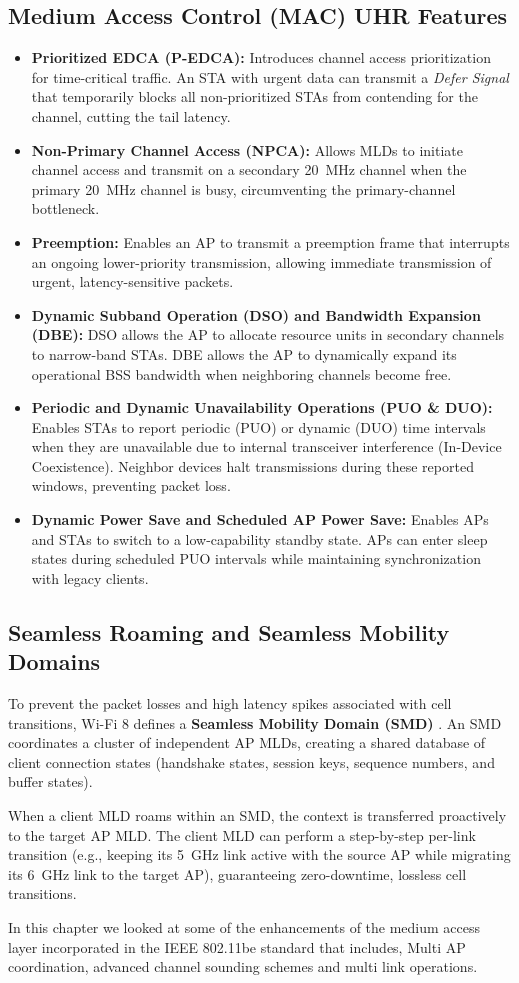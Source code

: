 \subsection{Medium Access Control (MAC) UHR Features}
\begin{itemize}
    \item \textbf{Prioritized EDCA (P-EDCA):} Introduces channel access prioritization for time-critical traffic. An STA with urgent data can transmit a \textit{Defer Signal} that temporarily blocks all non-prioritized STAs from contending for the channel, cutting the tail latency.
    \item \textbf{Non-Primary Channel Access (NPCA):} Allows MLDs to initiate channel access and transmit on a secondary 20~MHz channel when the primary 20~MHz channel is busy, circumventing the primary-channel bottleneck.
    \item \textbf{Preemption:} Enables an AP to transmit a preemption frame that interrupts an ongoing lower-priority transmission, allowing immediate transmission of urgent, latency-sensitive packets.
    \item \textbf{Dynamic Subband Operation (DSO) and Bandwidth Expansion (DBE):} DSO allows the AP to allocate resource units in secondary channels to narrow-band STAs. DBE allows the AP to dynamically expand its operational BSS bandwidth when neighboring channels become free.
    \item \textbf{Periodic and Dynamic Unavailability Operations (PUO \& DUO):} Enables STAs to report periodic (PUO) or dynamic (DUO) time intervals when they are unavailable due to internal transceiver interference (In-Device Coexistence). Neighbor devices halt transmissions during these reported windows, preventing packet loss.
    \item \textbf{Dynamic Power Save and Scheduled AP Power Save:} Enables APs and STAs to switch to a low-capability standby state. APs can enter sleep states during scheduled PUO intervals while maintaining synchronization with legacy clients.
\end{itemize}

\subsection{Seamless Roaming and Seamless Mobility Domains}
To prevent the packet losses and high latency spikes associated with cell transitions, Wi-Fi 8 defines a \textbf{Seamless Mobility Domain (SMD)} \cite{karamysheva2025tutorial}. An SMD coordinates a cluster of independent AP MLDs, creating a shared database of client connection states (handshake states, session keys, sequence numbers, and buffer states).

When a client MLD roams within an SMD, the context is transferred proactively to the target AP MLD. The client MLD can perform a step-by-step per-link transition (e.g., keeping its 5~GHz link active with the source AP while migrating its 6~GHz link to the target AP), guaranteeing zero-downtime, lossless cell transitions.

In this chapter we looked at some of the enhancements of the medium access layer incorporated in the IEEE 802.11be standard that includes, Multi AP coordination, advanced channel sounding schemes and multi link operations.